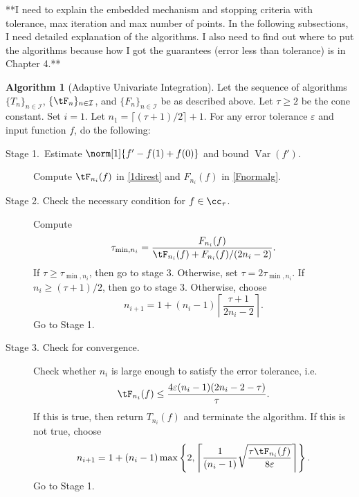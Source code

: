 \documentclass{iitthesis}
\DeclareMathOperator{\Var}{Var}
\theoremstyle{definition}
\newtheorem{algo}{Algorithm}
\theoremstyle{remark}
\begin{document}


**I need to explain the embedded mechanism and stopping criteria with tolerance, max iteration and max number of points. In the following subsections, I need detailed explanation of the algorithms. I also need to find out where to put the algorithms because how I got the guarantees (error less than tolerance) is in Chapter 4.**



\begin{algo}[Adaptive Univariate Integration] \label{multistageintegalgo}
Let the sequence of algorithms $\{T_n\}_{n\in \mathcal{I}}$, $\{\tF_n\}_{n\in \mathcal{I}}$, and $\{F_n\}_{n\in \mathcal{I}}$ be as described above.
Let $\tau\ge2$ be the cone constant. Set $i=1$. Let $n_1=\lceil(\tau+1)/2\rceil+1$. For any error tolerance $\varepsilon$ and input function $f$, do the following:
\begin{description}
\item[Stage 1.\ Estimate {$\norm[1]{f'-f(1)+f(0)}$} and bound {$\Var(f')$}.] Compute $\tF_{n_i}(f)$ in \eqref{1direst} and $F_{n_i}(f)$ in \eqref{Fnormalg}.

\item[Stage 2. Check the necessary condition for $f \in \cc_{\tau}$.] Compute
    \begin{align*}
     \tau_{\min,n_i} =  \frac{F_{n_i}(f)}{\tF_{n_i}(f)+F_{n_i}(f)/(2n_i-2)}.
    \end{align*}
If $\tau \ge \tau_{\min,n_i}$, then go to stage 3.  Otherwise, set $\tau = 2\tau_{\min,n_i}$.  If $n_i \ge (\tau+1)/2$, then go to stage 3.  Otherwise, choose
$$
n_{i+1}=1+ (n_i-1)\left\lceil\frac{\tau+1}{2n_i-2}\right\rceil.
$$
Go to Stage 1.

\item[Stage 3. Check for convergence.] Check whether $n_i$ is large enough to satisfy the error tolerance, i.e.
    \begin{equation*}
     \tF_{n_i}(f) \le \frac{4\varepsilon(n_i-1)(2n_i-2 - \tau)}{\tau}.
    \end{equation*}
If this is true, then return $T_{n_i}(f)$ and terminate the algorithm.   If this is not true, choose
$$
n_{i+1}=1+ (n_i-1)\max\left\{2,\left\lceil\frac{1}{(n_i-1)}\sqrt{\frac{\tau \tF_{n_i}(f)}{8\varepsilon}}\right\rceil\right\}.
$$
Go to Stage 1.
\end{description}
\end{algo}
\end{document}
